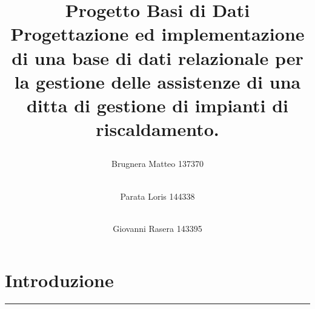 \documentclass[legalpaper]{article}
\begin{document}
\title{%
\raggedright \textbf{Progetto Basi di Dati} \\ \large \bigskip Progettazione ed implementazione di una base di dati relazionale per la gestione delle assistenze di una ditta di gestione di impianti di riscaldamento.}
\maketitle

\begin{flushleft}
\author{Brugnera Matteo 137370 \and \\ Parata Loris 144338 \and \\ Giovanni Rasera 143395}

\end{flushleft}

\newpage

\tableofcontents

\newpage
\section{Introduzione}
\rule{\linewidth}{1.5pt}
\end{document}
